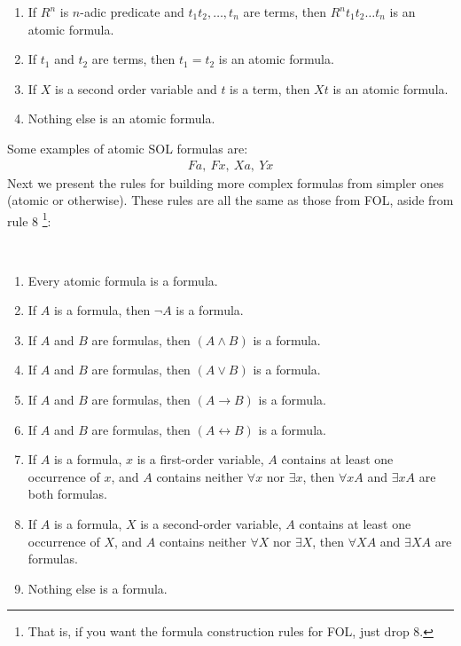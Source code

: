 \begin{definition}\leavevmode
    \begin{enumerate}
        \item If $R^n$ is $n$-adic predicate and $t_1 t_2 , \dots, t_n$ are terms, then $R^n t_1 t_2 \dots t_n$ is an atomic formula.
        \item If $t_1$ and $t_2$ are terms, then $t_1=t_2$ is an atomic formula.
        \item If $X$ is a second order variable and $t$ is a term, then $Xt$ is an atomic formula.
        \item Nothing else is an atomic formula.
    \end{enumerate}
\end{definition}
Some examples of atomic SOL formulas are: 
\begin{align*}
    Fa, \ Fx, \ Xa, \ Yx
\end{align*}
\newpage
Next we present the rules for building more complex formulas from simpler ones (atomic or otherwise). These rules are all the same as those from FOL, aside from rule 8 \footnote{That is, if you want the formula construction rules for FOL, just drop 8.}:
\begin{definition} \hspace{0.1in}\\
    \begin{enumerate}
        \item Every atomic formula is a formula.
        \item If $ A $ is a formula, then $ \neg A $ is a formula.
        \item If $ A $ and $ B $ are formulas, then $ (A \wedge B) $ is a formula.
        \item If $ A $ and $ B $ are formulas, then $ (A \vee B) $ is a formula.
        \item If $ A $ and $ B $ are formulas, then $ (A \rightarrow B) $ is a formula.
        \item If $ A $ and $ B $ are formulas, then $ (A \leftrightarrow B) $ is a formula.
        \item If $ A $ is a formula, $ x $ is a first-order variable, $ A $ contains at least one occurrence of $ x $, and $ A $ contains neither $ \forall x $ nor $ \exists x $, then $ \forall x A $ and $ \exists x A $ are both formulas.
        \item If $ A $ is a formula, $ X $ is a second-order variable, $ A $ contains at least one occurrence of $ X $, and $ A $ contains neither $ \forall X $ nor $ \exists X $, then $ \forall X A $ and $ \exists X A $ are formulas.
        \item Nothing else is a formula.
    \end{enumerate}    
\end{definition}
